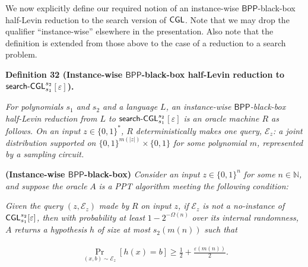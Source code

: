 \documentclass[10pt,a4paper]{article}
\begin{document}



We now explicitly define our required notion of an instance-wise ${\mathsf{BPP}}$-black-box half-Levin reduction to the search version of ${\sf CGL}$. Note that we may drop the qualifier “instance-wise” elsewhere in the presentation. Also note that the definition is extended from those above to the case of a reduction to a search problem.\par





\par\medskip\noindent\textbf{
\textbf{Definition 32}\textbf{ }(Instance-wise ${\mathsf{BPP}}$-black-box half-Levin reduction to ${\sf search}\text{-}{\sf CGL}_{s_{1}}^{s_{2}}$$[\varepsilon]$)\textbf{.}
}\par



\emph{For polynomials $s_{1}$ and $s_{2}$ and a language $L$, an instance-wise ${\mathsf{BPP}}$-black-box half-Levin reduction from $L$ to ${\sf search}\text{-}{\sf CGL}_{s_{1}}^{s_{2}}$$[\varepsilon]$ is an oracle machine $R$ as follows. On an input $z\in\{0,1\}^{*}$, $R$ deterministically makes one query, $\mathcal{E}_{z}$: a joint distribution supported on $\{0,1\}^{m(|z|)}\times\{0,1\}$ for some polynomial $m$, represented by a sampling circuit.}\par




\textbf{(Instance-wise ${\mathsf{BPP}}$-black-box)}\emph{
Consider an input }$z\in\{0,1\}^{n}$\emph{ for some }$n\in\mathbb{N}$\emph{, and suppose the oracle }$A$\emph{ is a PPT algorithm meeting the following condition:}\par



\emph{Given the query }$(z,\mathcal{E}_{z})$\emph{ made by }$R$\emph{ on input }$z$\emph{, if }$\mathcal{E}_{z}$\emph{ is not a no-instance of }${\sf CGL}_{s_{1}}^{s_{2}}[\varepsilon]$\emph{, then with probability at least }$1-2^{-\Omega(n)}$\emph{ over its internal randomness, }$A$\emph{ returns a hypothesis }$h$\emph{ of size at most }$s_{2}(m(n))$\emph{ such that}\par


\[\begin{gathered}
\Pr_{(x,b)\sim\mathcal{E}_{z}}[h(x)=b]\geq\frac{1}{2}+\frac{\varepsilon(m(n))}{2}.
\end{gathered}\]
\end{document}
